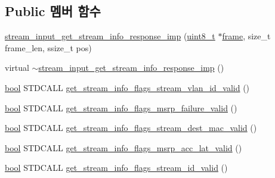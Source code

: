 \subsection*{Public 멤버 함수}
\begin{DoxyCompactItemize}
\item 
\hyperlink{classavdecc__lib_1_1stream__input__get__stream__info__response__imp_adfd71940d57eaaa1ba5698ff74aba5a8}{stream\+\_\+input\+\_\+get\+\_\+stream\+\_\+info\+\_\+response\+\_\+imp} (\hyperlink{stdint_8h_aba7bc1797add20fe3efdf37ced1182c5}{uint8\+\_\+t} $\ast$\hyperlink{gst__avb__playbin_8c_ac8e710e0b5e994c0545d75d69868c6f0}{frame}, size\+\_\+t frame\+\_\+len, ssize\+\_\+t pos)
\item 
virtual \hyperlink{classavdecc__lib_1_1stream__input__get__stream__info__response__imp_a2aec56cc44d409a06cb4f311ded28d86}{$\sim$stream\+\_\+input\+\_\+get\+\_\+stream\+\_\+info\+\_\+response\+\_\+imp} ()
\item 
\hyperlink{avb__gptp_8h_af6a258d8f3ee5206d682d799316314b1}{bool} S\+T\+D\+C\+A\+LL \hyperlink{classavdecc__lib_1_1stream__input__get__stream__info__response__imp_a6a60826aa7a0e78e97eb38892cb0fa60}{get\+\_\+stream\+\_\+info\+\_\+flags\+\_\+stream\+\_\+vlan\+\_\+id\+\_\+valid} ()
\item 
\hyperlink{avb__gptp_8h_af6a258d8f3ee5206d682d799316314b1}{bool} S\+T\+D\+C\+A\+LL \hyperlink{classavdecc__lib_1_1stream__input__get__stream__info__response__imp_a18e2eec8784db9a04cc61196b3214c90}{get\+\_\+stream\+\_\+info\+\_\+flags\+\_\+msrp\+\_\+failure\+\_\+valid} ()
\item 
\hyperlink{avb__gptp_8h_af6a258d8f3ee5206d682d799316314b1}{bool} S\+T\+D\+C\+A\+LL \hyperlink{classavdecc__lib_1_1stream__input__get__stream__info__response__imp_a9abc3deb6bb3d8a854f59f5062194c1f}{get\+\_\+stream\+\_\+info\+\_\+flags\+\_\+stream\+\_\+dest\+\_\+mac\+\_\+valid} ()
\item 
\hyperlink{avb__gptp_8h_af6a258d8f3ee5206d682d799316314b1}{bool} S\+T\+D\+C\+A\+LL \hyperlink{classavdecc__lib_1_1stream__input__get__stream__info__response__imp_acaf4f9080f85559bfadc7a4ac6d67e7d}{get\+\_\+stream\+\_\+info\+\_\+flags\+\_\+msrp\+\_\+acc\+\_\+lat\+\_\+valid} ()
\item 
\hyperlink{avb__gptp_8h_af6a258d8f3ee5206d682d799316314b1}{bool} S\+T\+D\+C\+A\+LL \hyperlink{classavdecc__lib_1_1stream__input__get__stream__info__response__imp_a36fe42e1dc53a6caaf6db2c4b44926d7}{get\+\_\+stream\+\_\+info\+\_\+flags\+\_\+stream\+\_\+id\+\_\+valid} ()
\item 

\end{DoxyCompactItemize}
